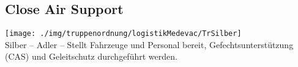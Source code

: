 \subsection{Close Air Support}
\texttt{[image: ./img/truppenordnung/logistikMedevac/TrSilber]}\\
Silber -- Adler -- Stellt Fahrzeuge und Personal bereit,  Gefechtsunterstützung (\ac{CAS}) und Geleitschutz durchgeführt werden.